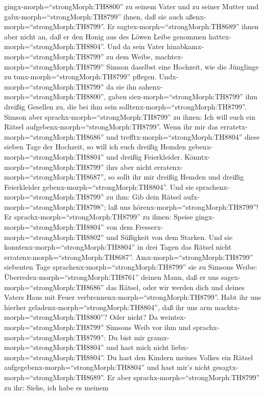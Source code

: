 gingx-morph=``strongMorph:TH8800'' zu seinem Vater und zu seiner Mutter
und gabx-morph=``strongMorph:TH8799'' ihnen, daß sie auch
aßenx-morph=``strongMorph:TH8799''. Er
sagtex-morph=``strongMorph:TH8689'' ihnen aber nicht an, daß er den
Honig aus des Löwen Leibe genommen hattex-morph=``strongMorph:TH8804''.
 Und da sein Vater hinabkamx-morph=``strongMorph:TH8799''
zu dem Weibe, machtex-morph=``strongMorph:TH8799'' Simson daselbst eine
Hochzeit, wie die Jünglinge zu tunx-morph=``strongMorph:TH8799''
pflegen.  Undx-morph=``strongMorph:TH8799'' da sie ihn
sahenx-morph=``strongMorph:TH8800'', gaben
siex-morph=``strongMorph:TH8799'' ihm dreißig Gesellen zu, die bei ihm
sein solltenx-morph=``strongMorph:TH8799''.  Simson aber
sprachx-morph=``strongMorph:TH8799'' zu ihnen: Ich will euch ein Rätsel
aufgebenx-morph=``strongMorph:TH8799''. Wenn ihr mir das
erratetx-morph=``strongMorph:TH8686'' und
trefftx-morph=``strongMorph:TH8804'' diese sieben Tage der Hochzeit, so
will ich euch dreißig Hemden gebenx-morph=``strongMorph:TH8804'' und
dreißig Feierkleider.  Könntx-morph=``strongMorph:TH8799''
ihrs aber nicht erratenx-morph=``strongMorph:TH8687'', so sollt ihr mir
dreißig Hemden und dreißig Feierkleider
gebenx-morph=``strongMorph:TH8804''. Und sie
sprachenx-morph=``strongMorph:TH8799'' zu ihm: Gib dein Rätsel
aufx-morph=``strongMorph:TH8798''; laß uns
hörenx-morph=``strongMorph:TH8799''!  Er
sprachx-morph=``strongMorph:TH8799'' zu ihnen: Speise
gingx-morph=``strongMorph:TH8804'' von dem
Fresserx-morph=``strongMorph:TH8802'' und Süßigkeit von dem Starken. Und
sie konntenx-morph=``strongMorph:TH8804'' in drei Tagen das Rätsel nicht
erratenx-morph=``strongMorph:TH8687''. 
Amx-morph=``strongMorph:TH8799'' siebenten Tage
sprachenx-morph=``strongMorph:TH8799'' sie zu Simsons Weibe:
Überredex-morph=``strongMorph:TH8761'' deinen Mann, daß er uns
sagex-morph=``strongMorph:TH8686'' das Rätsel, oder wir werden dich und
deines Vaters Haus mit Feuer verbrennenx-morph=``strongMorph:TH8799''.
Habt ihr uns hierher geladenx-morph=``strongMorph:TH8804'', daß ihr uns
arm machtx-morph=``strongMorph:TH8800''? Oder nicht?  Da
weintex-morph=``strongMorph:TH8799'' Simsons Weib vor ihm und
sprachx-morph=``strongMorph:TH8799'': Du bist mir
gramx-morph=``strongMorph:TH8804'' und hast mich nicht
liebx-morph=``strongMorph:TH8804''. Du hast den Kindern meines Volkes
ein Rätsel aufgegebenx-morph=``strongMorph:TH8804'' und hast mir's nicht
gesagtx-morph=``strongMorph:TH8689''. Er aber
sprachx-morph=``strongMorph:TH8799'' zu ihr: Siehe, ich habe es meinem
